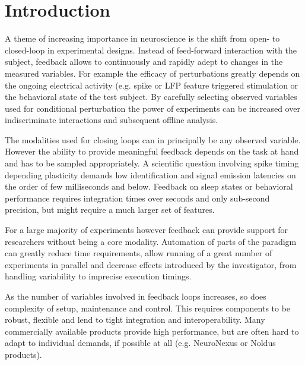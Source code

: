\section{Introduction}


A theme of increasing importance in neuroscience is the shift from open- to closed-loop in experimental designs. Instead of feed-forward interaction with the subject, feedback allows to continuously and rapidly adept to changes in the measured variables. For example the efficacy of perturbations greatly depends on the ongoing electrical activity (e.g. spike or LFP feature triggered stimulation \cite{Berenyi2012,Girardeau2009} or the behavioral state of the test subject. By carefully selecting observed variables used for conditional perturbation the power of experiments can be increased over indiscriminate interactions and subsequent offline analysis.

The modalities used for closing loops can in principally be any observed variable. However the ability to provide meaningful feedback depends on the task at hand and has to be sampled appropriately. A scientific question involving spike timing depending plasticity demands low identification and signal emission latencies on the order of few milliseconds and below. Feedback on sleep states or behavioral performance requires integration times over seconds and only sub-second precision, but might require a much larger set of features.

For a large majority of experiments however feedback can provide support for researchers without being a core modality. Automation of parts of the paradigm can greatly reduce time requirements, allow running of a great number of experiments in parallel and decrease effects introduced by the investigator, from handling variability to imprecise execution timings.

As the number of variables involved in feedback loops increases, so does complexity of setup, maintenance and control. This requires components to be robust, flexible and lend to tight integration and interoperability. Many commercially available products provide high performance, but are often hard to adapt to individual demands, if possible at all (e.g. NeuroNexus or Noldus products). 

